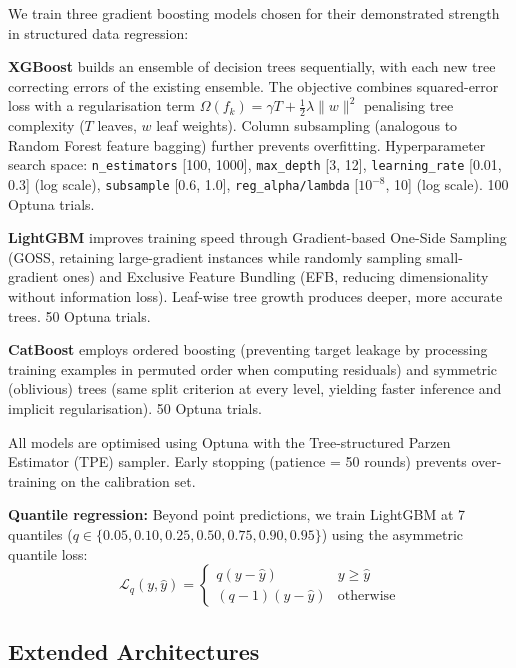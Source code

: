 \documentclass[10pt,a4paper,twocolumn]{article}
\begin{document}
We train three gradient boosting models chosen for their demonstrated strength in structured data regression:

\textbf{XGBoost} \citep{chen2016xgboost} builds an ensemble of decision trees sequentially, with each new tree correcting errors of the existing ensemble. The objective combines squared-error loss with a regularisation term $\Omega(f_k) = \gamma T + \frac{1}{2}\lambda \|w\|^2$ penalising tree complexity ($T$ leaves, $w$ leaf weights). Column subsampling (analogous to Random Forest feature bagging) further prevents overfitting. Hyperparameter search space: \texttt{n\_estimators} [100, 1000], \texttt{max\_depth} [3, 12], \texttt{learning\_rate} [0.01, 0.3] (log scale), \texttt{subsample} [0.6, 1.0], \texttt{reg\_alpha/lambda} [$10^{-8}$, 10] (log scale). 100 Optuna trials.

\textbf{LightGBM} \citep{ke2017lightgbm} improves training speed through Gradient-based One-Side Sampling (GOSS, retaining large-gradient instances while randomly sampling small-gradient ones) and Exclusive Feature Bundling (EFB, reducing dimensionality without information loss). Leaf-wise tree growth produces deeper, more accurate trees. 50 Optuna trials.

\textbf{CatBoost} \citep{prokhorenkova2018catboost} employs ordered boosting (preventing target leakage by processing training examples in permuted order when computing residuals) and symmetric (oblivious) trees (same split criterion at every level, yielding faster inference and implicit regularisation). 50 Optuna trials.

All models are optimised using Optuna \citep{akiba2019optuna} with the Tree-structured Parzen Estimator (TPE) sampler. Early stopping (patience = 50 rounds) prevents over-training on the calibration set.

\textbf{Quantile regression:} Beyond point predictions, we train LightGBM at 7 quantiles ($q \in \{0.05, 0.10, 0.25, 0.50, 0.75, 0.90, 0.95\}$) using the asymmetric quantile loss:
\begin{equation}
\mathcal{L}_q(y, \hat{y}) = \begin{cases} q(y - \hat{y}) & y \geq \hat{y} \\ (q-1)(y - \hat{y}) & \text{otherwise} \end{cases}
\end{equation}

\subsection{Extended Architectures}
\end{document}

